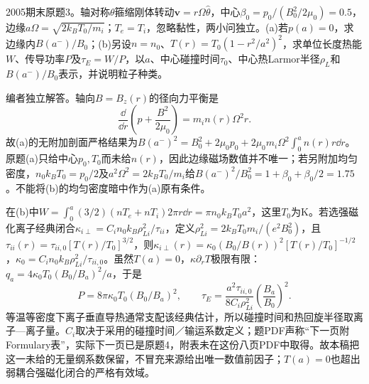 \begin{exercise}\label{ex:hist05-final-3}
2005期末原题3。轴对称$\theta$箍缩刚体转动$\mathbf v=r\Omega\hat\theta$，中心$\beta_0=p_0/(B_0^2/2\mu_0)=0.5$，边缘$a\Omega=\sqrt{2k_BT_0/m_i}$；$T_e=T_i$，忽略黏性，两小问独立。(a)若$p(a)=0$，求边缘内$B(a^-)/B_0$；(b)另设$n=n_0$、$T(r)=T_0(1-r^2/a^2)^2$，求单位长度热能$W$、传导功率$P$及$\tau_E=W/P$，以$a$、中心碰撞时间$\tau_0$、中心热Larmor半径$\rho_L$和$B(a^-)/B_0$表示，并说明粒子种类。
\end{exercise}
\begin{solution}
编者独立解答。轴向$B=B_z(r)$的径向力平衡是
\begin{equation}\frac{\dd}{\dd r}\left(p+\frac{B^2}{2\mu_0}\right)=m_in(r)\Omega^2r.\end{equation}
故(a)的无附加剖面严格结果为$B(a^-)^2=B_0^2+2\mu_0p_0+2\mu_0m_i\Omega^2\int_0^a n(r)r\dd r$。原题(a)只给中心$p_0,T_0$而未给$n(r)$，因此边缘磁场数值并不唯一；若另附加均匀密度，$n_0k_BT_0=p_0/2$及$a^2\Omega^2=2k_BT_0/m_i$给$B(a^-)^2/B_0^2=1+\beta_0+\beta_0/2=1.75$。不能将(b)的均匀密度暗中作为(a)原有条件。

在(b)中$W=\int_0^a(3/2)(nT_e+nT_i)2\pi r\dd r=\pi n_0 k_BT_0a^2$，这里$T_0$为K。若选强磁化离子经典闭合$\kappa_{i\perp}=C_i n_0k_B\rho_{Li}^2/\tau_{ii}$，定义$\rho_{Li}^2=2k_BT_0m_i/(e^2B_0^2)$，且$\tau_{ii}(r)=\tau_{ii,0}[T(r)/T_0]^{3/2}$，则$\kappa_{i\perp}(r)=\kappa_0(B_0/B(r))^2[T(r)/T_0]^{-1/2}$，$\kappa_0=C_i n_0k_B\rho_{Li}^2/\tau_{ii,0}$。虽然$T(a)=0$，$\kappa\partial_rT$极限有限：$q_a=4\kappa_0T_0(B_0/B_a)^2/a$，于是
\begin{equation}
P=8\pi\kappa_0T_0(B_0/B_a)^2,\qquad
\tau_E=\frac{a^2\tau_{ii,0}}{8C_i\rho_{Li}^2}\left(\frac{B_a}{B_0}\right)^2.
\end{equation}
等温等密度下离子垂直导热通常支配该经典估计，所以碰撞时间和热回旋半径取离子—离子量。$C_i$取决于采用的碰撞时间／输运系数定义；题PDF声称“下一页附Formulary表”，实际下一页已是原题4，附表未在这份八页PDF中取得。故本稿把这一未给的无量纲系数保留，不冒充来源给出唯一数值前因子；$T(a)=0$也超出弱耦合强磁化闭合的严格有效域。
\end{solution}
